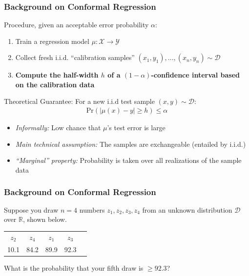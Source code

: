 \documentclass[handout]{beamer}
\begin{document}
\begin{frame}
    \frametitle{Background on Conformal Regression \cite{lei2018distribution}}

    Procedure, given an acceptable error probability $\alpha$:
    \begin{enumerate}
    \item Train a regression model $\mu: \mathcal{X} \rightarrow \mathcal{Y}$
    \item Collect fresh i.i.d. ``calibration samples'' $(x_1, y_1), ..., (x_n, y_n) \sim \mathcal{D}$
    \item \textbf{Compute the half-width $h$ of a $(1-\alpha)$-confidence interval based on the calibration data}
    \end{enumerate}

    Theoretical Guarantee: For a new i.i.d test sample $(x, y) \sim \mathcal{D}$:
    \begin{align}
    \text{Pr}(|\mu(x) - y| \geq h) \leq \alpha
    \end{align}

    \begin{itemize}
    \item \textit{Informally:} Low chance that $\mu$'s test error is large

    \item \textit{Main technical assumption:} The samples are exchangeable (entailed by i.i.d.)

    \item \textit{``Marginal'' property:} Probability is taken over all realizations of the sample data 
   \end{itemize}

\end{frame}

\begin{frame}
    \frametitle{Background on Conformal Regression \cite{lei2018distribution}}

    Suppose you draw $n=4$ numbers $z_1, z_2, z_3, z_4$ from an unknown distribution $\mathcal{D}$ over $\mathbb{R}$, shown below.

    \vspace{3em}

    \begin{center}
    \begin{tabular}{ccccc}
    $z_2$ & $z_4$ & $z_1$ & $z_3$ & \phantom{$z_5$} \\
    10.1 & 84.2 & 89.9 & 92.3 & \phantom{99.9}
    \end{tabular}
    \end{center}
    
    \vspace{3em}

    What is the probability that your fifth draw is $\geq 92.3$? 

    \vspace{1em}


\end{frame}
\end{document}
